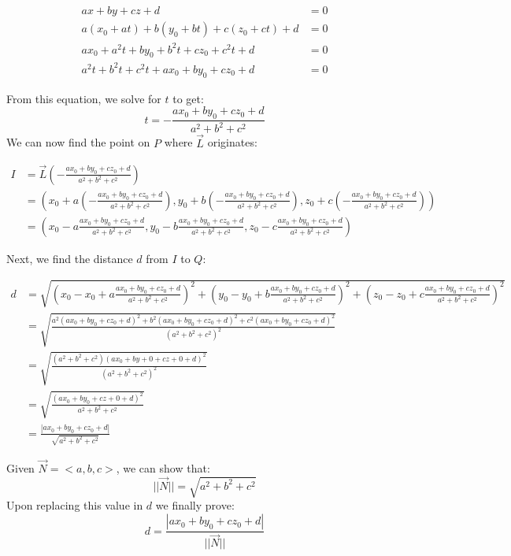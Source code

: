 \documentclass{article}
\begin{document}
\begin{align*}
ax + by + cz + d &= 0 \\
a(x_0 + at) + b(y_0 + bt) + c(z_0 + ct) + d &= 0 \\
ax_0 + a^2t + by_0 + b^2t + cz_0 + c^2t + d &= 0 \\
a^2t + b^2t + c^2t + ax_0 + by_0 + cz_0 + d &= 0
\end{align*}

\begin{text}
\indent From this equation, we solve for $t$ to get:
$$
t = -\frac{ax_0 + by_0 + cz_0 + d}{a^2 + b^2 + c^2}
$$
\indent\indent We can now find the point on $P$ where $\vec{L}$ originates:
\end{text}

\begin{align*}
I &= \vec{L}(-\frac{ax_0 + by_0 + cz_0 + d}{a^2 + b^2 + c^2}) \\
  &= (x_0+a(-\frac{ax_0 + by_0 + cz_0 + d}{a^2 + b^2 + c^2}), y_0+b(-\frac{ax_0 + by_0 + cz_0 + d}{a^2 + b^2 + c^2}), z_0+c(-\frac{ax_0 + by_0 + cz_0 + d}{a^2 + b^2 + c^2})) \\
  &= (x_0-a\frac{ax_0 + by_0 + cz_0 + d}{a^2 + b^2 + c^2}, y_0-b\frac{ax_0 + by_0 + cz_0 + d}{a^2 + b^2 + c^2}, z_0-c\frac{ax_0 + by_0 + cz_0 + d}{a^2 + b^2 + c^2})
\end{align*}

\begin{text}
\indent Next, we find the distance $d$ from $I$ to $Q$: 
\end{text}

\begin{align*}
d &= \sqrt{(x_0 - x_0 + a\frac{ax_0 + by_0 + cz_0 + d}{a^2 + b^2 + c^2})^2 + (y_0 - y_0 + b\frac{ax_0 + by_0 + cz_0 + d}{a^2 + b^2 + c^2})^2 + (z_0 - z_0 + c\frac{ax_0 + by_0 + cz_0 + d}{a^2 + b^2 + c^2})^2} \\
&= \sqrt{\frac{a^2(ax_0+by_0+cz_0+d)^2 + b^2(ax_0+by_0+cz_0+d)^2 + c^2(ax_0+by_0+cz_0+d)^2}{(a^2 + b^2 + c^2)^2}} \\
&= \sqrt{\frac{(a^2 + b^2 + c^2)(ax_0+by+0+cz+0+d)^2}{(a^2 + b^2 + c^2)^2}} \\
&= \sqrt{\frac{(ax_0 + by_0 + cz+0 +d)^2}{a^2 + b^2 + c^2}} \\
&= \frac{|ax_0 + by_0 + cz_0 + d|}{\sqrt{a^2+b^2+c^2}}
\end{align*}

\begin{text}
\indent Given $\vec{N}=<a,b,c>$, we can show that: \\
$$
||\vec{N}|| = \sqrt{a^2+b^2+c^2}
$$
\indent\indent Upon replacing this value in $d$ we finally prove: \\
$$
d = \frac{|ax_0 + by_0 + cz_0 + d|}{||\vec{N}||}
$$
\end{text}
\end{document}
